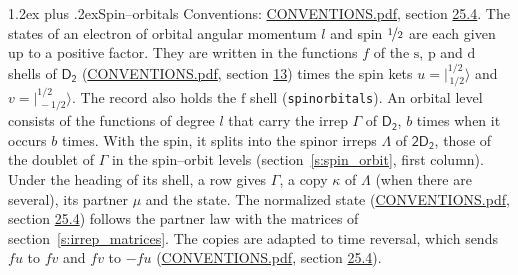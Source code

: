 \documentclass[10pt,a4paper]{article}
\makeatletter
\renewcommand\section{\@startsection{section}{1}{\z@}{-3ex plus -1ex minus -.2ex}%
  {1.2ex plus .2ex}{\normalfont\large\sffamily\bfseries\color{parttitle}}}
\numberwithin{equation}{section}
\newcommand{\grp}[1]{\mathsf{#1}}
\newcommand{\orbital}[1]{\mathrm{#1}}
\newcommand{\mult}{\kappa}
\newcommand{\intx}{\mu}
\newcommand{\jm}[2]{\bigl\lvert{}^{#1}_{\,#2}\bigr\rangle}
\makeatother
\begin{document}
\section{Spin--orbitals}\label{s:spin_orbitals}
Conventions: \href{../../CONVENTIONS.pdf}{CONVENTIONS.pdf}, section \href{../../CONVENTIONS.pdf\#conv.25.4}{25.4}.
\leavevmode\label{n:index.orbital.l}The states of an electron of orbital angular momentum $l$ and spin $\nicefrac{1}{2}$ are each given up to a positive factor. \label{n:local.spinor.uv}\label{n:local.function.f}They are written in the functions $f$ of the $\orbital{s}$, $\orbital{p}$ and $\orbital{d}$ shells of \href{../../../rotation/data/pdf/D2.pdf}{$\grp{D_{2}}$} (\href{../../CONVENTIONS.pdf}{CONVENTIONS.pdf}, section \href{../../../rotation/CONVENTIONS.pdf\#conv.13}{13}) times the spin kets $u = \jm{1/2}{1/2}$ and $v = \jm{1/2}{-1/2}$. The record also holds the $\orbital{f}$ shell (\texttt{spinorbitals}). An orbital level consists of the functions of degree $l$ that carry the irrep $\Gamma$ of \href{../../../rotation/data/pdf/D2.pdf}{$\grp{D_{2}}$}, $b$ times when it occurs $b$ times. With the spin, it splits into the spinor irreps $\Lambda$ of $\grp{2D_{2}}$, those of the doublet of $\Gamma$ in the spin--orbit levels (section~\ref{s:spin_orbit}, first column). \label{n:head.state}Under the heading of its shell, a row gives $\Gamma$, a copy $\mult$ of $\Lambda$ (when there are several), its partner $\intx$ and the state. The normalized state (\href{../../CONVENTIONS.pdf}{CONVENTIONS.pdf}, section \href{../../CONVENTIONS.pdf\#conv.25.4}{25.4}) follows the partner law with the matrices of section~\ref{s:irrep_matrices}. The copies are adapted to time reversal, which sends $f u$ to $f v$ and $f v$ to $-f u$ (\href{../../CONVENTIONS.pdf}{CONVENTIONS.pdf}, section \href{../../CONVENTIONS.pdf\#conv.25.4}{25.4}).
\end{document}

